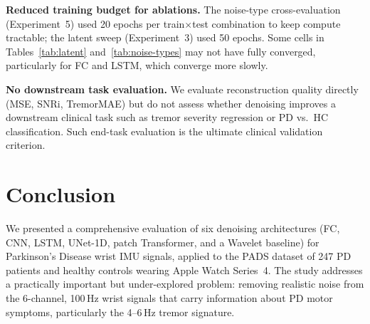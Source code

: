 \documentclass{article}
\begin{document}
\textbf{Reduced training budget for ablations.}
The noise-type cross-evaluation (Experiment~5) used 20 epochs per
train$\times$test combination to keep compute tractable; the latent sweep
(Experiment~3) used 50 epochs.
Some cells in Tables~\ref{tab:latent} and~\ref{tab:noise-types} may not
have fully converged, particularly for FC and LSTM, which converge more
slowly.

\textbf{No downstream task evaluation.}
We evaluate reconstruction quality directly (MSE, SNRi, TremorMAE) but do
not assess whether denoising improves a downstream clinical task such as
tremor severity regression or PD vs.\ HC classification.
Such end-task evaluation is the ultimate clinical validation criterion.

\section{Conclusion}
\label{sec:conclusion}

We presented a comprehensive evaluation of six denoising architectures
(FC, CNN, LSTM, UNet-1D, patch Transformer, and a Wavelet baseline) for
Parkinson's Disease wrist IMU signals, applied to the PADS dataset of 247
PD patients and healthy controls wearing Apple Watch Series~4.
The study addresses a practically important but under-explored problem:
removing realistic noise from the 6-channel, 100\,Hz wrist signals that carry
information about PD motor symptoms, particularly the 4--6\,Hz tremor
signature.
\end{document}
